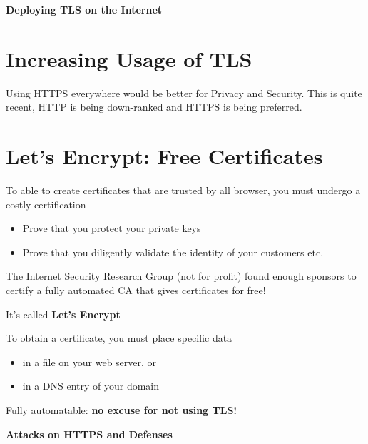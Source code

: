 \documentclass[11pt]{article}
\begin{document}
\vspace{0.5cm}

\begin{center}
  {\LARGE \textbf{Deploying TLS on the Internet}}
\end{center}

\vspace{1cm}

\section*{Increasing Usage of TLS}

Using HTTPS everywhere would be better for Privacy and Security. This is quite recent, HTTP is being down-ranked and HTTPS is being preferred. 
\section*{Let's Encrypt: Free Certificates}

To able to create certificates that are trusted by all browser, you must undergo a costly certification

\begin{itemize}
	\item Prove that you protect your private keys
	\item Prove that you diligently validate the identity of your customers etc. 
\end{itemize}

The Internet Security Research Group (not for profit) found enough sponsors to certify a fully automated CA that gives certificates for free!

It's called \textbf{Let's Encrypt}

To obtain a certificate, you must place specific data
\begin{itemize}
	\item in a file on your web server, or
	\item in a DNS entry of your domain
\end{itemize}

Fully automatable: \textbf{no excuse for not using TLS!} 


\vspace{0.5cm}

\begin{center}
  {\LARGE \textbf{Attacks on HTTPS and Defenses}}
\end{center}

\vspace{1cm}
\end{document}
